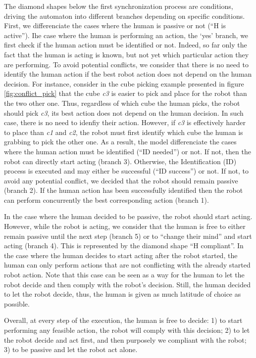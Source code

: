 The diamond shapes below the first synchronization process are conditions, driving the automaton into different branches depending on specific conditions. First, we differenciate the cases where the human is passive or not (``H is active''). 
Ihe case where the human is performing an action, the `yes' branch, we first check if the human action must be identified or not. Indeed, so far only the fact that the human is acting is known, but not yet which particular action they are performing. 
To avoid potential conflicts, we consider that there is no need to identify the human action if the best robot action does not depend on the human decision. For instance, consider in the cube picking example presented in figure \ref{fig:conflict_pick} that the cube \emph{c3} is easier to pick and place for the robot than the two other one. Thus, regardless of which cube the human picks, the robot should pick \emph{c3}, its best action does not depend on the human decision. In such case, there is no need to idenfiy their action. However, if \emph{c3} is effectively harder to place than \emph{c1} and \emph{c2}, the robot must first identify which cube the human is grabbing to pick the other one. As a result, the model differenciate the cases where the human action must be identified (``ID needed'') or not. If not, then the robot can directly start acting (branch 3). Otherwise, the Identification (ID) process is executed and may either be successful (``ID success'') or not. If not, to avoid any potential conflict, we decided that the robot should remain passive (branch 2). If the human action has been successfully identified then the robot can perform concurrently the best corresponding action (branch 1).

In the case where the human decided to be passive, the robot should start acting. 
However, while the robot is acting, we consider that the human is free to either remain passive until the next step (branch 5) or to ``change their mind'' and start acting (branch 4).
This is represented by the diamond shape ``H compliant''. In the case where the human decides to start acting after the robot started, the human can only perform actions that are not conflicting with the already started robot action. Note that this case can be seen as a way for the human to let the robot decide and then comply with the robot's decision. Still, the human decided to let the robot decide, thus, the human is given as much latitude of choice as possible.

Overall, at every step of the execution, the human is free to decide: 1) to start performing any feasible action, the robot will comply with this decision; 2) to let the robot decide and act first, and then purposely we compliant with the robot; 3) to be passive and let the robot act alone.

